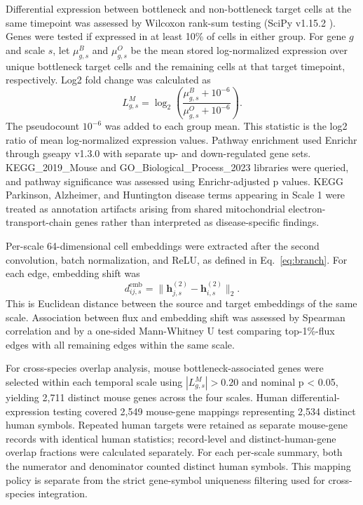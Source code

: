 Differential expression between bottleneck and non-bottleneck target cells at the same timepoint was assessed by Wilcoxon rank-sum testing (SciPy v1.15.2 \cite{ref122}). Genes were tested if expressed in at least 10\% of cells in either group. For gene \(g\) and scale \(s\), let \(\mu_{g,s}^{B}\) and \(\mu_{g,s}^{O}\) be the mean stored log-normalized expression over unique bottleneck target cells and the remaining cells at that target timepoint, respectively. Log2 fold change was calculated as
\begin{equation}\label{eq:mouse-fold-change}
L_{g,s}^{M}=\log_2\!\left(
\frac{\mu_{g,s}^{B}+10^{-6}}{\mu_{g,s}^{O}+10^{-6}}\right).
\end{equation}
The pseudocount \(10^{-6}\) was added to each group mean. This statistic is the log2 ratio of mean log-normalized expression values. Pathway enrichment used Enrichr \cite{ref123} through gseapy v1.3.0 \cite{ref124} with separate up- and down-regulated gene sets. KEGG\_2019\_Mouse \cite{ref104} and GO\_Biological\_Process\_2023 \cite{ref125} libraries were queried, and pathway significance was assessed using Enrichr-adjusted p values. KEGG Parkinson, Alzheimer, and Huntington disease terms appearing in Scale 1 were treated as annotation artifacts arising from shared mitochondrial electron-transport-chain genes rather than interpreted as disease-specific findings.

Per-scale 64-dimensional cell embeddings were extracted after the second convolution, batch normalization, and ReLU, as defined in Eq.~\eqref{eq:branch}. For each edge, embedding shift was
\begin{equation}\label{eq:embedding-shift}
d_{ij,s}^{\mathrm{emb}}=
\|\boldsymbol h_{j,s}^{(2)}-\boldsymbol h_{i,s}^{(2)}\|_2.
\end{equation}
This is Euclidean distance between the source and target embeddings of the same scale. Association between flux and embedding shift was assessed by Spearman correlation and by a one-sided Mann-Whitney U test comparing top-1\%-flux edges with all remaining edges within the same scale.

For cross-species overlap analysis, mouse bottleneck-associated genes were selected within each temporal scale using \(|L_{g,s}^{M}|>0.20\) and nominal p < 0.05, yielding 2,711 distinct mouse genes across the four scales. Human differential-expression testing covered 2,549 mouse-gene mappings representing 2,534 distinct human symbols. Repeated human targets were retained as separate mouse-gene records with identical human statistics; record-level and distinct-human-gene overlap fractions were calculated separately. For each per-scale summary, both the numerator and denominator counted distinct human symbols. This mapping policy is separate from the strict gene-symbol uniqueness filtering used for cross-species integration.

